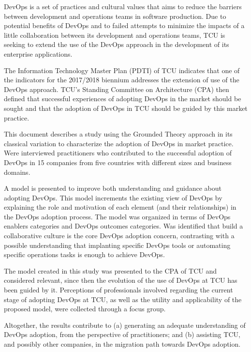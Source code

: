 DevOps is a set of practices and cultural values that aims to reduce the
barriers between development and operations teams in software production. Due
to potential benefits of DevOps and to failed attempts to minimize the impacts
of a little collaboration between its development and operations teams, \acrshort{TCU} is
seeking to extend the use of the DevOps approach in the development of its
enterprise applications.

The Information Technology Master Plan (PDTI) of \acrshort{TCU} indicates that
one of the indicators for the 2017/2018 biennium addresses the extension of
use of the DevOps approach. TCU's Standing Committee on Architecture (CPA) then
defined that successful experiences of adopting DevOps in the market should be
sought and that the adoption of DevOps in TCU should be guided by this market
practice.

This document describes a study using the Grounded Theory approach in its
classical variation to characterize the adoption of DevOps in market practice.
Were interviewed practitioners who contributed to the successful adoption of
DevOps in 15 companies from five countries with different sizes and business
domains.

A model is presented to improve both understanding and guidance about adopting
DevOps. This model increments the existing view of DevOps by explaining the
role and motivation of each element (and their relationships) in the DevOps
adoption process. The model was organized in terms of DevOps enablers categories
and DevOps outcomes categories. Was identified that build a collaborative culture
is the core DevOps adoption concern, contrasting with a possible understanding
that implanting specific DevOps tools or automating specific operations tasks is
enough to achieve DevOps.

The model created in this study was presented to the CPA of TCU and considered
relevant, since then the evolution of the use of DevOps at TCU has been guided
by it. Perceptions of professionals involved regarding the current
stage of adopting DevOps at TCU, as well as the utility and applicability of
the proposed model, were collected through a focus group.

Altogether, the results contribute to (a) generating an adequate understanding
of DevOps adoption, from the perspective of practitioners; and (b) assisting
\acrshort{TCU}, and possibly other companies, in the migration path towards
DevOps adoption.
